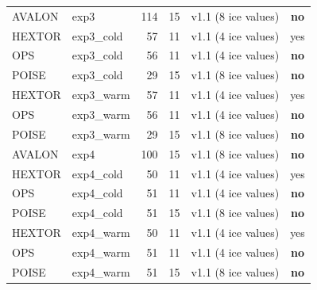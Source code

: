\begin{tabular}{llrrlc}
AVALON & exp3 & 114 & 15 & v1.1 (8 ice values) & \textbf{no} \\
HEXTOR & exp3\_cold & 57 & 11 & v1.1 (4 ice values) & yes \\
OPS & exp3\_cold & 56 & 11 & v1.1 (4 ice values) & \textbf{no} \\
POISE & exp3\_cold & 29 & 15 & v1.1 (8 ice values) & \textbf{no} \\
HEXTOR & exp3\_warm & 57 & 11 & v1.1 (4 ice values) & yes \\
OPS & exp3\_warm & 56 & 11 & v1.1 (4 ice values) & \textbf{no} \\
POISE & exp3\_warm & 29 & 15 & v1.1 (8 ice values) & \textbf{no} \\
AVALON & exp4 & 100 & 15 & v1.1 (8 ice values) & \textbf{no} \\
HEXTOR & exp4\_cold & 50 & 11 & v1.1 (4 ice values) & yes \\
OPS & exp4\_cold & 51 & 11 & v1.1 (4 ice values) & \textbf{no} \\
POISE & exp4\_cold & 51 & 15 & v1.1 (8 ice values) & \textbf{no} \\
HEXTOR & exp4\_warm & 50 & 11 & v1.1 (4 ice values) & yes \\
OPS & exp4\_warm & 51 & 11 & v1.1 (4 ice values) & \textbf{no} \\
POISE & exp4\_warm & 51 & 15 & v1.1 (8 ice values) & \textbf{no} \\
\bottomrule
\end{tabular}

